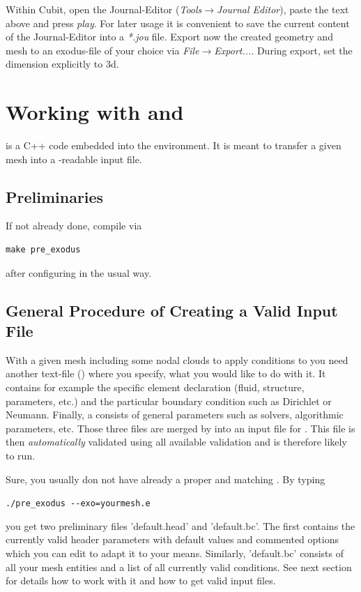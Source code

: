 Within Cubit, open the Journal-Editor (\emph{Tools}$\to$\emph{Journal
Editor}), paste the text above and press \emph{play}. For later usage it is convenient
to save the current content of the Journal-Editor into a \emph{*.jou} file. 
Export now the created geometry and mesh to an
exodus-file of your choice via \emph{File}$\to$\emph{Export...}. 
During export, set the dimension explicitly to 3d.

\section{Working with \prexo and \baci{}}

\prexo is a C++ code embedded into the \baci{} environment. It is meant to
transfer a given mesh into a \baci{}-readable input file.

\subsection{Preliminaries}

If not already done, compile \prexo via \begin{verbatim}make pre_exodus\end{verbatim} after 
configuring \baci{} in the usual way.

\subsection{General Procedure of Creating a Valid \baci{} Input File}
With a given mesh including some nodal clouds to apply conditions to you need
another text-file (\bc) where you specify, what you would like to do with
it. It contains for example the specific element declaration (fluid, structure,
parameters, etc.) and the particular boundary condition such as Dirichlet or
Neumann. Finally, a \head consists of general parameters such as
solvers, algorithmic parameters, etc. Those three files are merged by \prexo
into an input file for \baci{}. This file is then \emph{automatically} validated
using all available \baci{} validation and is therefore likely to run.

Sure, you usually don not have already a proper \head and matching \bc. By
typing
\begin{center}
  \verb|./pre_exodus --exo=yourmesh.e|
\end{center}
you get two preliminary files
'default.head' and 'default.bc'. The first contains the currently valid header
parameters with default values and commented options which you can edit to
adapt it to your means. Similarly, 'default.bc' consists of all your mesh
entities and a list of all currently valid conditions. See next section for
details how to work with it and how to get valid input files.

